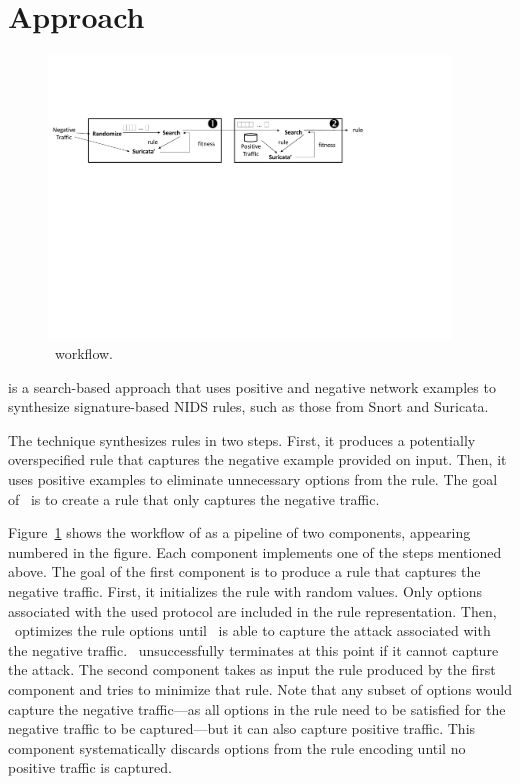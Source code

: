 \documentclass[runningheads]{llncs}
\begin{document}
\section{Approach}

\begin{figure}[t]
\centering
\includegraphics[trim=10 360 182 130,clip,width=0.95\textwidth]{figs/nids-workflow}
\caption{\tname\ workflow.}
\label{fig:overview}
\end{figure}

\tname{} is a search-based approach that uses positive and negative
network examples to synthesize signature-based NIDS rules, such as
those from Snort and Suricata.

The technique synthesizes rules in two steps. First, it produces a
potentially overspecified rule that captures the negative example
provided on input. Then, it uses positive examples to eliminate
unnecessary options from the rule. The goal of \tname\ is to create a
rule that only captures the negative traffic.

Figure~\ref{fig:overview} shows the workflow of \tname{} as a pipeline
of two components, appearing numbered in the figure. Each component
implements one of the steps mentioned above. The goal of the first
component is to produce a rule that captures the negative traffic.
First, it initializes the rule with random values. Only options
associated with the used protocol are included in the rule
representation. Then, \tname\ optimizes the rule options until
\suri\ is able to capture the attack associated with the negative
traffic.  \tname\ unsuccessfully terminates at this point if it cannot
capture the attack. The second component takes as input the rule
produced by the first component and tries to minimize that rule. Note
that any subset of options would capture the negative traffic---as all
options in the rule need to be satisfied for the negative traffic to
be captured---but it can also capture positive traffic. This component
systematically discards options from the rule encoding until no
positive traffic is captured.
\end{document}
